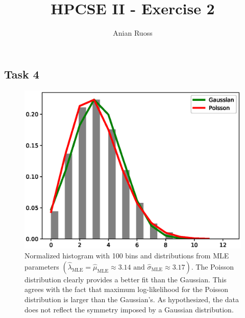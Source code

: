 \documentclass[11pt]{article}
\begin{document}
    \title{HPCSE II - Exercise 2}
    \author{Anian Ruoss}
    \maketitle

    \subsection*{Task 4}

    \begin{figure}[H]
        \begin{center}
            \includegraphics[width=.75\textwidth]{plots/hist_distributions.eps}
        \end{center}
        \caption{Normalized histogram with 100 bins and distributions from MLE
        parameters
        $\left(
        \hat{\lambda}_{\text{MLE}} = \hat{\mu}_{\text{MLE}} \approx 3.14
        \text{ and } \hat{\sigma}_{\text{MLE}} \approx 3.17 \right)$.
        The Poisson distribution clearly provides a better fit than the
        Gaussian.
        This agrees with the fact that maximum log-likelihood for the
        Poisson distribution is larger than the Gaussian's.
        As hypothesized, the data does not reflect the symmetry imposed by a
        Gaussian distribution.}
    \end{figure}
\end{document}
